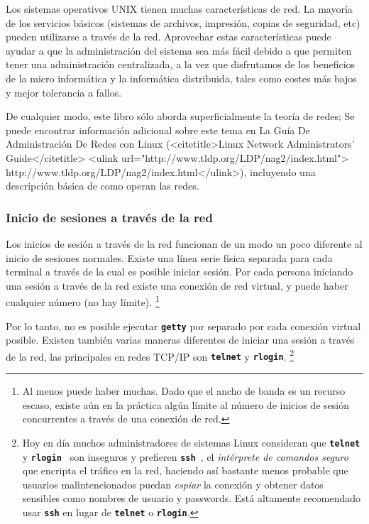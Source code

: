  Los sistemas operativos UNIX tienen muchas características de red. La
mayoría de los servicios básicos (sistemas de archivos, impresión, copias de
seguridad, etc) pueden utilizarse a través de la red. Aprovechar estas
características puede ayudar a que la administración del sistema sea más fácil
debido a que permiten tener una administración centralizada, a la vez que
disfrutamos de los beneficios de la micro informática y la informática
distribuida, tales como costes más bajos y mejor tolerancia a fallos.  

 De cualquier modo, este libro sólo aborda superficialmente la teoría de
redes; Se puede encontrar información adicional sobre este tema en La Guía De
Administración De Redes con  Linux (<citetitle>Linux Network Administrators' Guide</citetitle>
	<ulink url="http://www.tldp.org/LDP/nag2/index.html">
	http://www.tldp.org/LDP/nag2/index.html</ulink>), incluyendo una descripción básica de como
operan las redes.  



\subsubsection{ Inicio de sesiones a través de la red}

 Los inicios de sesión a través de la red funcionan de un modo un poco
diferente al inicio de sesiones normales. Existe una línea serie física separada
para cada terminal a través de la cual es posible iniciar sesión. Por cada
persona iniciando una sesión a través de la red existe una conexión de red
virtual, y puede haber cualquier número (no hay límite).  
\footnote{Al menos puede haber muchas. Dado que el ancho de banda es un
recurso escaso, existe aún en la práctica algún límite al
número de inicios de sesión concurrentes a través de una conexión
de red. }

Por lo tanto, no es
posible ejecutar \texttt{\textbf{getty}} por separado por cada conexión virtual posible. Existen
también varias maneras diferentes de iniciar una sesión a través de la red, las
principales en redes TCP/IP son \texttt{\textbf{telnet}} y \texttt{\textbf{rlogin}}.
\footnote{Hoy en día muchos administradores de sistemas Linux consideran
que \texttt{\textbf{telnet}} y \texttt{\textbf{rlogin }} son inseguros y
prefieren \texttt{\textbf{ssh }}, el \textit{intérprete de comandos
seguro} que 			encripta el tráfico en la red, haciendo
así bastante menos probable que usuarios malintencionados puedan
\textit{espiar} la 				conexión y obtener datos
sensibles como nombres de usuario y 				passwords. Está
altamente recomendado usar \texttt{\textbf{ssh}} 			en lugar
de \texttt{\textbf{telnet}} o \texttt{\textbf{rlogin}}.  }


